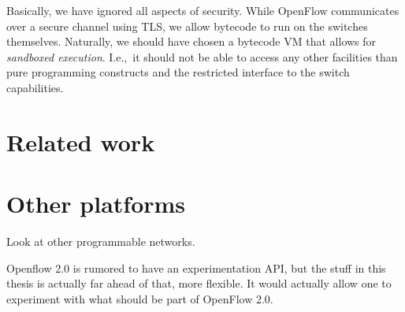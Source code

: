 Basically, we have ignored all aspects of security.  While OpenFlow
communicates over a secure channel using \ac{TLS}, we
allow bytecode to run on the switches themselves.  Naturally, we should have
chosen a bytecode \acs{VM} that allows for \textit{sandboxed execution}.
I.e.,~it should not be able to access any other facilities than pure
programming constructs and the restricted interface to the switch
capabilities.


\section{Related work}


\section{Other platforms}

Look at other programmable networks.

Openflow 2.0 is rumored to have an experimentation API, but the stuff in
this thesis is actually far ahead of that, more flexible.
It would actually allow one to experiment with what should be part of
OpenFlow 2.0.
